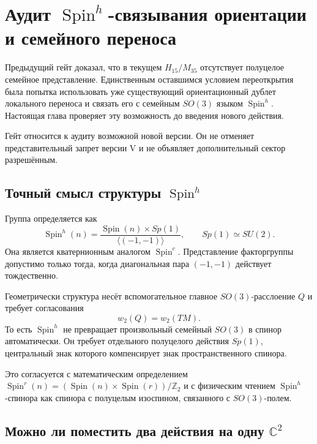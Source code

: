 \chapter{Аудит
\texorpdfstring{$\operatorname{Spin}^h$}{Spin-h}-связывания ориентации и
семейного переноса}

Предыдущий гейт доказал, что в текущем $H_{15}/M_{35}$ отсутствует
полуцелое семейное представление. Единственным оставшимся условием
переоткрытия была попытка использовать уже существующий ориентационный
дублет локального переноса и связать его с семейным $SO(3)$ языком
$\operatorname{Spin}^h$. Настоящая глава проверяет эту возможность до
введения нового действия.

Гейт относится к аудиту возможной новой версии. Он не отменяет
представительный запрет версии V и не объявляет дополнительный сектор
разрешённым.

\section{Точный смысл структуры
\texorpdfstring{$\operatorname{Spin}^h$}{Spin-h}}

Группа определяется как
\begin{equation}
 \operatorname{Spin}^h(n)=
 \frac{\operatorname{Spin}(n)\times Sp(1)}
 {\langle(-1,-1)\rangle},
 \qquad Sp(1)\simeq SU(2).
 \label{eq:v5-spinh-definition}
\end{equation}
Она является кватернионным аналогом $\operatorname{Spin}^c$. Представление
факторгруппы допустимо только тогда, когда диагональная пара
$(-1,-1)$ действует тождественно.

Геометрически структура несёт вспомогательное главное $SO(3)$-расслоение
$Q$ и требует согласования
\begin{equation}
 w_2(Q)=w_2(TM).
 \label{eq:v5-spinh-w2-condition}
\end{equation}
То есть $\operatorname{Spin}^h$ не превращает произвольный семейный
$SO(3)$ в спинор автоматически. Он требует отдельного полуцелого действия
$Sp(1)$, центральный знак которого компенсирует знак пространственного
спинора.

Это согласуется с математическим определением
$\operatorname{Spin}^r(n)=(\operatorname{Spin}(n)\times
\operatorname{Spin}(r))/\mathbb Z_2$ и с физическим чтением
$\operatorname{Spin}^h$-спинора как спинора с полуцелым изоспином,
связанного с $SO(3)$-полем.

\section{Можно ли поместить два действия на одну
\texorpdfstring{$\mathbb C^2$}{C2}}

